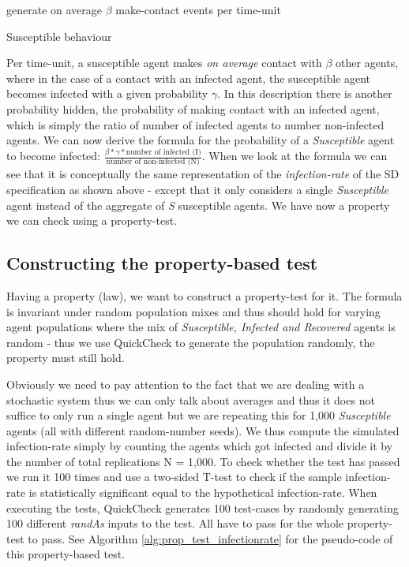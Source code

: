 \begin{algorithm}
generate on average $\beta$ make-contact events per time-unit\; 
\caption{Susceptible behaviour}
\end{algorithm}

Per time-unit, a susceptible agent makes \textit{on average} contact with $\beta$ other agents, where in the case of a contact with an infected agent, the susceptible agent becomes infected with a given probability $\gamma$. In this description there is another probability hidden, the probability of making contact with an infected agent, which is simply the ratio of number of infected agents to number non-infected agents. We can now derive the formula for the probability of a \textit{Susceptible} agent to become infected: $\frac{\beta * \gamma * \text{number of infected (I)}}{\text{number of non-infected (N)}}$. When we look at the formula we can see that it is conceptually the same representation of the \textit{infection-rate} of the SD specification as shown above - except that it only considers a single \textit{Susceptible} agent instead of the aggregate of \textit{S} susceptible agents. We have now a property we can check using a property-test.

\subsection{Constructing the property-based test}
Having a property (law), we want to construct a property-test for it. The formula is invariant under random population mixes and thus should hold for varying agent populations where the mix of \textit{Susceptible, Infected and Recovered} agents is random - thus we use QuickCheck to generate the population randomly, the property must still hold.

Obviously we need to pay attention to the fact that we are dealing with a stochastic system thus we can only talk about averages and thus it does not suffice to only run a single agent but we are repeating this for 1,000 \textit{Susceptible} agents (all with different random-number seeds). We thus compute the simulated infection-rate simply by counting the agents which got infected and divide it by the number of total replications N = 1,000. To check whether the test has passed we run it 100 times and use a two-sided T-test to check if the sample infection-rate is statistically significant equal to the hypothetical infection-rate. When executing the tests, QuickCheck generates 100 test-cases by randomly generating 100 different \textit{randAs} inputs to the test. All have to pass for the whole property-test to pass. See Algorithm \ref{alg:prop_test_infectionrate} for the pseudo-code of this property-based test.

